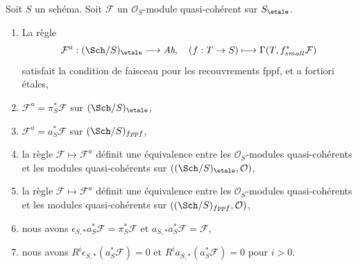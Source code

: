 \begin{lemma}
\label{lemma-review-quasi-coherent}
Soit $S$ un schéma. Soit $\mathcal{F}$ un
$\mathcal{O}_S$-module quasi-cohérent sur $S_\etale$.
\begin{enumerate}
\item La règle
$$
\mathcal{F}^a : (\Sch/S)_\etale \longrightarrow \textit{Ab},\quad
(f : T \to S) \longmapsto \Gamma(T, f_{small}^*\mathcal{F})
$$
satisfait la condition de faisceau pour les recouvrements fppf, et a fortiori étales,
\item $\mathcal{F}^a = \pi_S^*\mathcal{F}$ sur $(\Sch/S)_\etale$,
\item $\mathcal{F}^a = a_S^*\mathcal{F}$ sur $(\Sch/S)_{fppf}$,
\item la règle $\mathcal{F} \mapsto \mathcal{F}^a$ définit
une équivalence entre les $\mathcal{O}_S$-modules quasi-cohérents
et les modules quasi-cohérents sur
$((\Sch/S)_\etale, \mathcal{O})$,
\item la règle $\mathcal{F} \mapsto \mathcal{F}^a$ définit
une équivalence entre les $\mathcal{O}_S$-modules quasi-cohérents
et les modules quasi-cohérents sur
$((\Sch/S)_{fppf}, \mathcal{O})$,
\item nous avons $\epsilon_{S, *}a_S^*\mathcal{F} = \pi_S^*\mathcal{F}$
et $a_{S, *}a_S^*\mathcal{F} = \mathcal{F}$,
\item nous avons $R^i\epsilon_{S, *}(a_S^*\mathcal{F}) = 0$
et $R^ia_{S, *}(a_S^*\mathcal{F}) = 0$ pour $i > 0$.
\end{enumerate}
\end{lemma}

